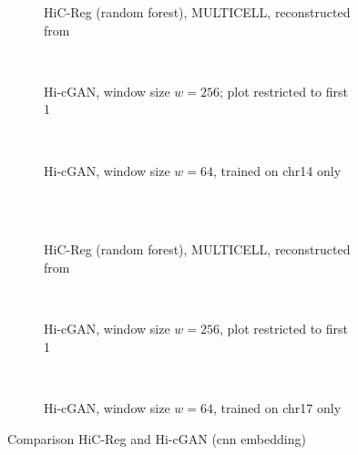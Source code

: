 \begin{figure}[htbp]
\begin{subfigure}{\textwidth}
 \centering
 \caption{HiC-Reg (random forest), MULTICELL, reconstructed from \cite{Zhang2019}} \label{fig:results:zhang-vs-ours_matrices_multicell-14}
\end{subfigure}\\[5mm]
\begin{subfigure}{\textwidth}
 \centering
 \caption{Hi-cGAN, window size $w=256$; plot restricted to first \SI{1}{\mega\bp}} \label{fig:results:zhang-vs-ours_matrices_ours-full-14}
\end{subfigure}\\[5mm]
\begin{subfigure}{\textwidth}
 \centering
 \caption{Hi-cGAN, window size $w=64$, trained on chr14 only} \label{fig:results:zhang-vs-ours_matrices_ours-only-14}
\end{subfigure}\\[4mm]
    \\[5mm]
    \begin{subfigure}{\textwidth}
 \centering
 \caption{HiC-Reg (random forest), MULTICELL, reconstructed from \cite{Zhang2019}} \label{fig:results:zhang-vs-ours_matrices_multicell-17}
\end{subfigure}\\[5mm]
\begin{subfigure}{\textwidth}
 \centering
 \caption{Hi-cGAN, window size $w=256$, plot restricted to first \SI{1}{\mega\bp}}\label{fig:results:zhang-vs-ours_matrices_ours-full-17}
\end{subfigure}\\[5mm]
\begin{subfigure}{\textwidth}
 \centering
 \caption{Hi-cGAN, window size $w=64$, trained on chr17 only} \label{fig:results:zhang-vs-ours_matrices_ours-only-17}
\end{subfigure}
\caption{Comparison HiC-Reg \cite{Zhang2019} and Hi-cGAN (\acrshort{cnn} embedding)} \label{fig:results:zhang-vs-ours_matrices}
\end{figure}
\clearpage 

